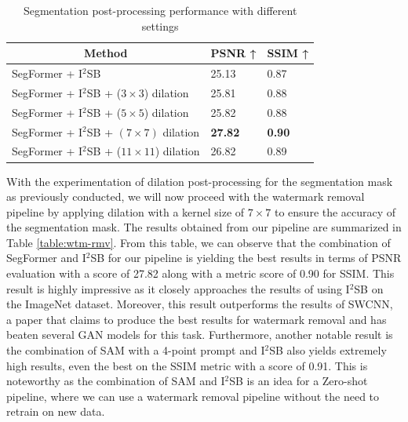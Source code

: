 \begin{table}[t]
    \centering
    \begin{tabular}{lll}
        \hline
        \multicolumn{1}{c}{\textbf{Method}}                                                & \multicolumn{1}{c}{\textbf{PSNR ↑}} & \multicolumn{1}{c}{\textbf{SSIM ↑}} \\ \hline
        SegFormer + I$^2$SB & 25.13                                & 0.87                                 \\ 
        SegFormer + I$^2$SB + ($3 \times 3$) dilation & {25.81}                       & {0.88}                        \\ 
        SegFormer + I$^2$SB + ($5 \times 5$) dilation & {25.82}                       & {0.88}                        \\ 
        SegFormer + I$^2$SB + ${(7 \times 7)}$ {dilation} & \textbf{27.82}                       & \textbf{0.90}                        \\ 
        SegFormer + I$^2$SB + ($11 \times 11$) dilation & {26.82}                       & {0.89}                        \\ \hline
    \end{tabular}
    \caption{Segmentation post-processing performance with different settings}
    \label{table:segformer-kernel}
\end{table}
With the experimentation of dilation post-processing for the segmentation mask as previously conducted, we will now proceed with the watermark removal pipeline by applying dilation with a kernel size of $7 \times 7$ to ensure the accuracy of the segmentation mask. The results obtained from our pipeline are summarized in Table \ref{table:wtm-rmv}. From this table, we can observe that the combination of SegFormer and I$^2$SB for our pipeline is yielding the best results in terms of PSNR evaluation with a score of 27.82 along with a metric score of 0.90 for SSIM. This result is highly impressive as it closely approaches the results of using I$^2$SB on the ImageNet dataset. Moreover, this result outperforms the results of SWCNN, a paper that claims to produce the best results for watermark removal and has beaten several GAN models for this task. Furthermore, another notable result is the combination of SAM with a 4-point prompt and I$^2$SB also yields extremely high results, even the best on the SSIM metric with a score of 0.91. This is noteworthy as the combination of SAM and I$^2$SB is an idea for a Zero-shot pipeline, where we can use a watermark removal pipeline without the need to retrain on new data.
